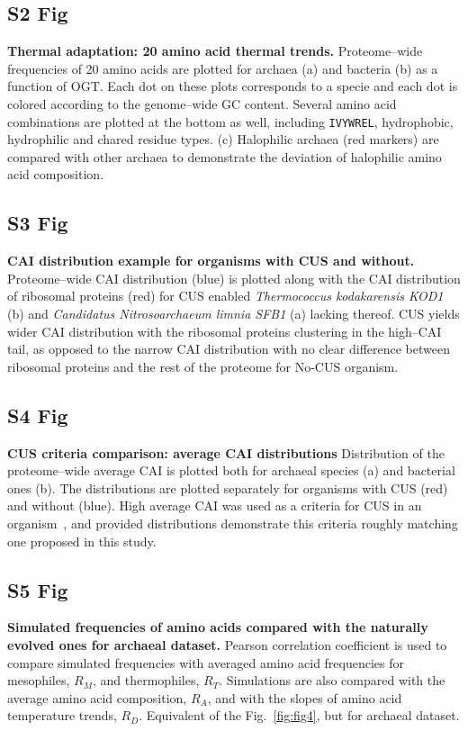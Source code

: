 \documentclass[10pt,letterpaper]{article}
\begin{document}
\subsection*{S2 Fig}
\label{fig:s2}
{\bf Thermal adaptation: 20 amino acid thermal trends. }
Proteome--wide frequencies of 20 amino acids are plotted for archaea (a) and bacteria (b) as a function of OGT. Each dot on these plots corresponds to a specie and each dot is colored according to the genome--wide GC content. Several amino acid combinations are plotted at the bottom as well, including \texttt{IVYWREL}, hydrophobic, hydrophilic and chared residue types. (c) Halophilic archaea (red markers) are compared with other archaea to demonstrate the deviation of halophilic amino acid composition.



\subsection*{S3 Fig}
\label{fig:s3}
{\bf CAI distribution example for organisms with CUS and without.}
Proteome--wide CAI distribution (blue) is plotted along with the CAI distribution of ribosomal proteins (red) for CUS enabled {\it Thermococcus kodakarensis KOD1} (b) and {\it Candidatus Nitrosoarchaeum limnia SFB1} (a) lacking thereof. CUS yields wider CAI distribution with the ribosomal proteins clustering in the high--CAI tail, as opposed to the narrow CAI distribution with no clear difference between ribosomal proteins and the rest of the proteome for No-CUS organism.


\subsection*{S4 Fig}
\label{fig:s4}
{\bf CUS criteria comparison: average CAI distributions}
Distribution of the proteome--wide average CAI is plotted both for archaeal species (a) and bacterial ones (b). 
The distributions are plotted separately for organisms with CUS (red) and without (blue). High average CAI was used as a criteria for CUS in an organism~\cite{Botzman2011Variation}, and provided distributions demonstrate this criteria roughly matching one proposed in this study.


\subsection*{S5 Fig}
\label{fig:s5}
{\bf Simulated frequencies of amino acids compared with the naturally evolved ones for archaeal dataset.} Pearson correlation coefficient is used to compare simulated frequencies with averaged amino acid frequencies for mesophiles, $R_M$, and thermophiles, $R_T$. Simulations are also compared with the average amino acid composition, $R_A$, and with the slopes of amino acid temperature trends, $R_D$. Equivalent of the Fig.~\ref{fig:fig4}, but for archaeal dataset.
\end{document}

